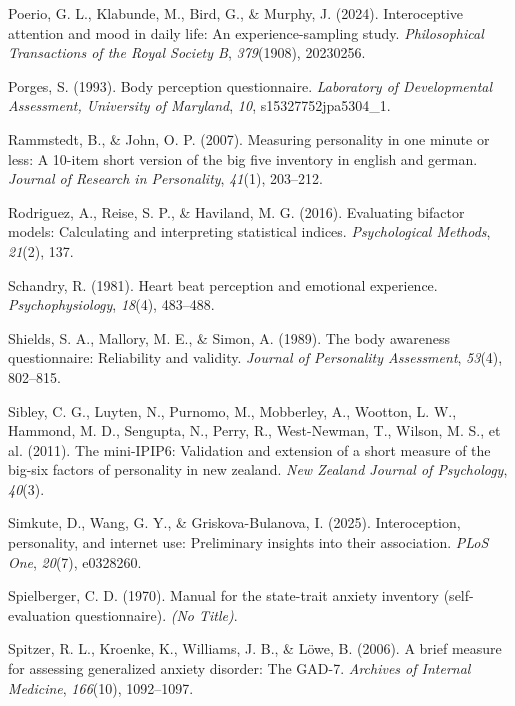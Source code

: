 \documentclass[
  jou,
  floatsintext,
  longtable,
  nolmodern,
  notxfonts,
  notimes,
  colorlinks=true,linkcolor=blue,citecolor=blue,urlcolor=blue]{apa7}
\newlength{\cslhangindent}
\newenvironment{CSLReferences}[2] %
 {\begin{list}{}{%
  \setlength{\itemindent}{0pt}
  \setlength{\leftmargin}{0pt}
  \setlength{\parsep}{0pt}
  \ifodd #1
   \setlength{\leftmargin}{\cslhangindent}
   \setlength{\itemindent}{-1\cslhangindent}
  \fi
  \setlength{\itemsep}{#2\baselineskip}}}
 {\end{list}}
\begin{document}
\begin{CSLReferences}{1}{0}
Poerio, G. L., Klabunde, M., Bird, G., \& Murphy, J. (2024).
Interoceptive attention and mood in daily life: An experience-sampling
study. \emph{Philosophical Transactions of the Royal Society B},
\emph{379}(1908), 20230256.

Porges, S. (1993). Body perception questionnaire. \emph{Laboratory of
Developmental Assessment, University of Maryland}, \emph{10},
s15327752jpa5304\_1.

Rammstedt, B., \& John, O. P. (2007). Measuring personality in one
minute or less: A 10-item short version of the big five inventory in
english and german. \emph{Journal of Research in Personality},
\emph{41}(1), 203--212.

Rodriguez, A., Reise, S. P., \& Haviland, M. G. (2016). Evaluating
bifactor models: Calculating and interpreting statistical indices.
\emph{Psychological Methods}, \emph{21}(2), 137.

Schandry, R. (1981). Heart beat perception and emotional experience.
\emph{Psychophysiology}, \emph{18}(4), 483--488.

Shields, S. A., Mallory, M. E., \& Simon, A. (1989). The body awareness
questionnaire: Reliability and validity. \emph{Journal of Personality
Assessment}, \emph{53}(4), 802--815.

Sibley, C. G., Luyten, N., Purnomo, M., Mobberley, A., Wootton, L. W.,
Hammond, M. D., Sengupta, N., Perry, R., West-Newman, T., Wilson, M. S.,
et al. (2011). The mini-IPIP6: Validation and extension of a short
measure of the big-six factors of personality in new zealand. \emph{New
Zealand Journal of Psychology}, \emph{40}(3).

Simkute, D., Wang, G. Y., \& Griskova-Bulanova, I. (2025).
Interoception, personality, and internet use: Preliminary insights into
their association. \emph{PLoS One}, \emph{20}(7), e0328260.

Spielberger, C. D. (1970). Manual for the state-trait anxiety inventory
(self-evaluation questionnaire). \emph{(No Title)}.

Spitzer, R. L., Kroenke, K., Williams, J. B., \& Löwe, B. (2006). A
brief measure for assessing generalized anxiety disorder: The GAD-7.
\emph{Archives of Internal Medicine}, \emph{166}(10), 1092--1097.


\end{CSLReferences}
\end{document}
